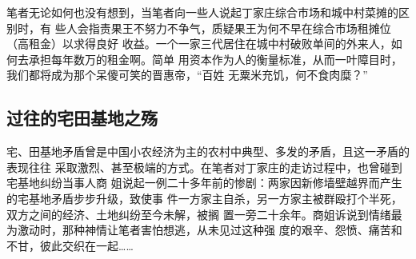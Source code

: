 笔者无论如何也没有想到，当笔者向一些人说起丁家庄综合市场和城中村菜摊的区别时，有
些人会指责果王不努力不争气，质疑果王为何不早在综合市场租摊位（高租金）以求得良好
收益。一个一家三代居住在城中村破败单间的外来人，如何去承担每年数万的租金啊。简单
用资本作为人的衡量标准，从而一叶障目时，我们都将成为那个呆傻可笑的晋惠帝，“百姓
无粟米充饥，何不食肉糜？”

\subsection{过往的宅田基地之殇}







宅、田基地矛盾曾是中国小农经济为主的农村中典型、多发的矛盾，且这一矛盾的表现往往
采取激烈、甚至极端的方式。在笔者对丁家庄的走访过程中，也曾碰到宅基地纠纷当事人商
姐说起一例二十多年前的惨剧：两家因新修墙壁越界而产生的宅基地矛盾步步升级，致使事
件一方家主自杀，另一方家主被群殴打个半死，双方之间的经济、土地纠纷至今未解，被搁
置一旁二十余年。商姐诉说到情绪最为激动时，那种神情让笔者害怕想逃，从未见过这种强
度的艰辛、怨愤、痛苦和不甘，彼此交织在一起……

